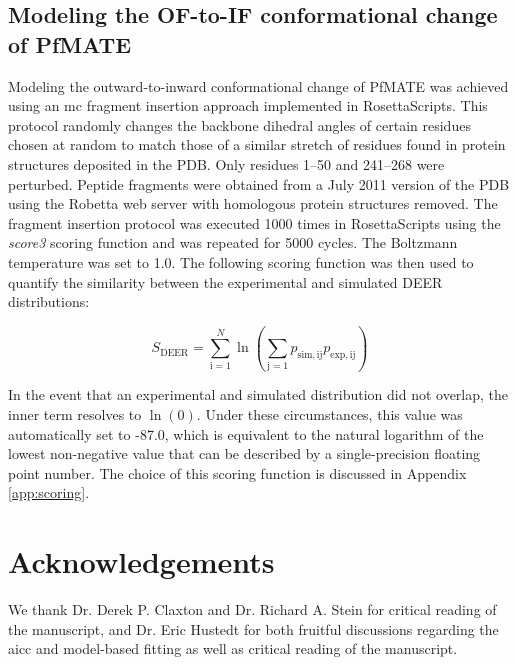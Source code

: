 \subsection{Modeling the OF-to-IF conformational change of PfMATE}

Modeling the outward-to-inward conformational change of PfMATE was achieved using an \gls{mc} fragment insertion approach implemented in RosettaScripts. This protocol randomly changes the backbone dihedral angles of certain residues chosen at random to match those of a similar stretch of residues found in protein structures deposited in the PDB. Only residues 1–50 and 241–268 were perturbed. Peptide fragments were obtained from a July 2011 version of the PDB using the Robetta web server \citep*{Kim2011} with homologous protein structures removed. The fragment insertion protocol was executed 1000 times in RosettaScripts using the \emph{score3} scoring function and was repeated for 5000 cycles. The Boltzmann temperature was set to 1.0. The following scoring function was then used to quantify the similarity between the experimental and simulated DEER distributions:

\begin{equation}
    S_{\mathup{DEER}} = \sum_{\mathup{i}=1}^{N} \ln \left( \sum_{\mathup{j}=1} p_{\mathup{sim,ij}}p_{\mathup{exp,ij}} \right)
\end{equation}

In the event that an experimental and simulated distribution did not overlap, the inner term resolves to $\ln \left(0 \right)$. Under these circumstances, this value was automatically set to -87.0, which is equivalent to the natural logarithm of the lowest non-negative value that can be described by a single-precision floating point number. The choice of this scoring function is discussed in Appendix \ref{app:scoring}.

\section{Acknowledgements}

We thank Dr. Derek P. Claxton and Dr. Richard A. Stein for critical reading of the manuscript, and Dr. Eric Hustedt for both fruitful discussions regarding the \gls{aicc} and model-based fitting as well as critical reading of the manuscript.